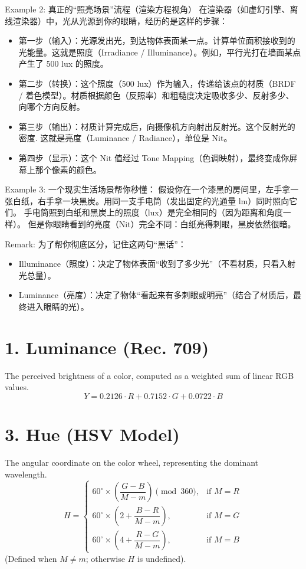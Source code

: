 \documentclass[UTF8]{ctexart}
\begin{document}
Example 2: 真正的“照亮场景”流程（渲染方程视角）
在渲染器（如虚幻引擎、离线渲染器）中，光从光源到你的眼睛，经历的是这样的步骤：
\begin{itemize}
	\item 第一步（输入）：光源发出光，到达物体表面某一点。计算单位面积接收到的光能量。这就是照度（Irradiance / Illuminance）。例如，平行光打在墙面某点产生了 500 lux 的照度。
	\item 第二步（转换）：这个照度（500 lux）作为输入，传递给该点的材质（BRDF / 着色模型）。材质根据颜色（反照率）和粗糙度决定吸收多少、反射多少、向哪个方向反射。
	\item 第三步（输出）：材质计算完成后，向摄像机方向射出反射光。这个反射光的密度. 这就是亮度（Luminance / Radiance），单位是 Nit。
    \item 第四步（显示）：这个 Nit 值经过 Tone Mapping（色调映射），最终变成你屏幕上那个像素的颜色。
\end{itemize}
Example 3: 一个现实生活场景帮你秒懂：
假设你在一个漆黑的房间里，左手拿一张白纸，右手拿一块黑炭。用同一支手电筒（发出固定的光通量 lm）同时照向它们。 手电筒照到白纸和黑炭上的照度（lux）是完全相同的（因为距离和角度一样）。 但是你眼睛看到的亮度（Nit）完全不同：白纸亮得刺眼，黑炭依然很暗。

Remark: 为了帮你彻底区分，记住这两句“黑话”：
\begin{itemize}
	\item Illuminance（照度）：决定了物体表面“收到了多少光”（不看材质，只看入射光总量）。
	\item Luminance（亮度）：决定了物体“看起来有多刺眼或明亮”（结合了材质后，最终进入眼睛的光）。
\end{itemize}

	
\section*{1. Luminance (Rec. 709)}
The perceived brightness of a color, computed as a weighted sum of linear RGB values.
\begin{equation}
	Y = 0.2126 \cdot R + 0.7152 \cdot G + 0.0722 \cdot B
\end{equation}


\section*{3. Hue (HSV Model)}
The angular coordinate on the color wheel, representing the dominant wavelength.
\begin{equation}
	H = 
	\begin{cases} 
		60^\circ \times \left( \dfrac{G - B}{M - m} \right) \pmod{360}, & \text{if } M = R \\[12pt]
		60^\circ \times \left( 2 + \dfrac{B - R}{M - m} \right), & \text{if } M = G \\[12pt]
		60^\circ \times \left( 4 + \dfrac{R - G}{M - m} \right), & \text{if } M = B
	\end{cases}
\end{equation}
(Defined when $M \neq m$; otherwise $H$ is undefined).
\end{document}
